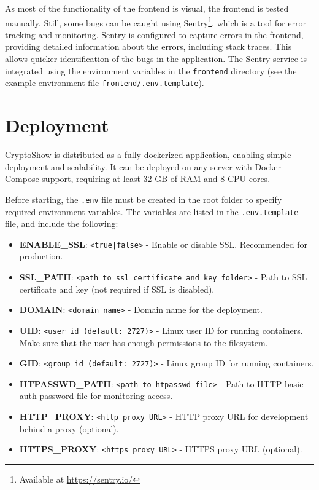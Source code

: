 As most of the functionality of the frontend is visual, the frontend is tested manually. Still, some bugs can be caught using Sentry\footnote{Available at \url{https://sentry.io/}}, which is a tool for error tracking and monitoring. Sentry is configured to capture errors in the frontend, providing detailed information about the errors, including stack traces. This allows quicker identification of the bugs in the application. The Sentry service is integrated using the environment variables in the \lstinline|frontend| directory (see the example environment file \lstinline!frontend/.env.template!).

\section{Deployment}
\label{sec:deployment}

CryptoShow is distributed as a fully dockerized application, enabling simple deployment and scalability. It can be deployed on any server with Docker Compose support, requiring at least 32 GB of RAM and 8 CPU cores.

Before starting, the \lstinline|.env| file must be created in the root folder to specify required environment variables. The variables are listed in the \lstinline|.env.template| file, and include the following:

\begin{itemize}
    \item \textbf{ENABLE\_SSL}: \texttt{<true|false>} - Enable or disable SSL. Recommended for production.
    \item \textbf{SSL\_PATH}: \texttt{<path to ssl certificate and key folder>} - Path to SSL certificate and key (not required if SSL is disabled).
    \item \textbf{DOMAIN}: \texttt{<domain name>} - Domain name for the deployment.
    \item \textbf{UID}: \texttt{<user id (default: 2727)>} - Linux user ID for running containers. Make sure that the user has enough permissions to the filesystem.
    \item \textbf{GID}: \texttt{<group id (default: 2727)>} - Linux group ID for running containers.
    \item \textbf{HTPASSWD\_PATH}: \texttt{<path to htpasswd file>} - Path to HTTP basic auth password file for monitoring access.
    \item \textbf{HTTP\_PROXY}: \texttt{<http proxy URL>} - HTTP proxy URL for development behind a proxy (optional).
    \item \textbf{HTTPS\_PROXY}: \texttt{<https proxy URL>} - HTTPS proxy URL (optional).
\end{itemize}

